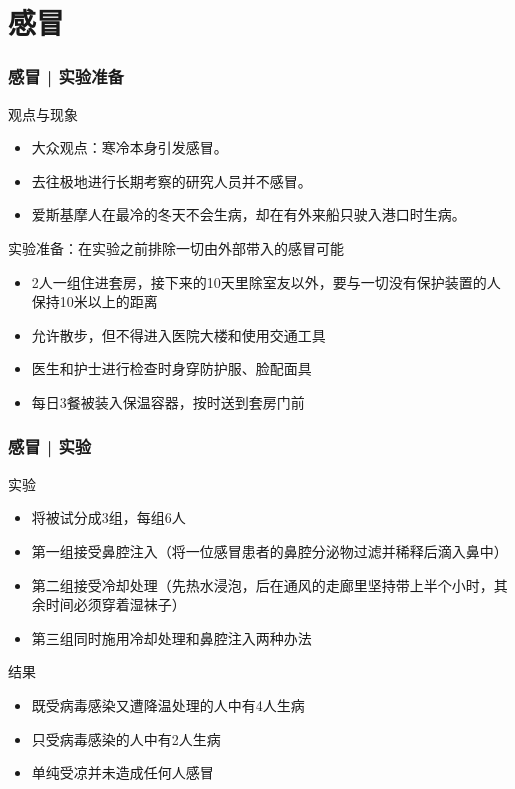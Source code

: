 \section{感冒}
\begin{frame}
  \frametitle{感冒 | 实验准备}
  \begin{block}{观点与现象}
    \begin{itemize}
      \item 大众观点：寒冷本身引发感冒。
      \item 去往极地进行长期考察的研究人员并不感冒。
      \item 爱斯基摩人在最冷的冬天不会生病，却在有外来船只驶入港口时生病。
    \end{itemize}
  \end{block}
  \pause
  \begin{block}{实验准备：在实验之前排除一切由外部带入的感冒可能}
    \begin{itemize}
      \item 2人一组住进套房，接下来的10天里除室友以外，要与一切没有保护装置的人保持10米以上的距离
      \item 允许散步，但不得进入医院大楼和使用交通工具
      \item 医生和护士进行检查时身穿防护服、脸配面具
      \item 每日3餐被装入保温容器，按时送到套房门前
    \end{itemize}
  \end{block}
\end{frame}

\begin{frame}
  \frametitle{感冒 | 实验}
  \begin{block}{实验}
    \begin{itemize}
      \item 将被试分成3组，每组6人
      \item 第一组接受鼻腔注入（将一位感冒患者的鼻腔分泌物过滤并稀释后滴入鼻中）
      \item 第二组接受冷却处理（先热水浸泡，后在通风的走廊里坚持带上半个小时，其余时间必须穿着湿袜子）
      \item 第三组同时施用冷却处理和鼻腔注入两种办法
    \end{itemize}
  \end{block}
  \pause
  \begin{block}{结果}
    \begin{itemize}
      \item 既受病毒感染又遭降温处理的人中有4人生病
      \item 只受病毒感染的人中有2人生病
      \item 单纯受凉并未造成任何人感冒
    \end{itemize}
  \end{block}
\end{frame}

